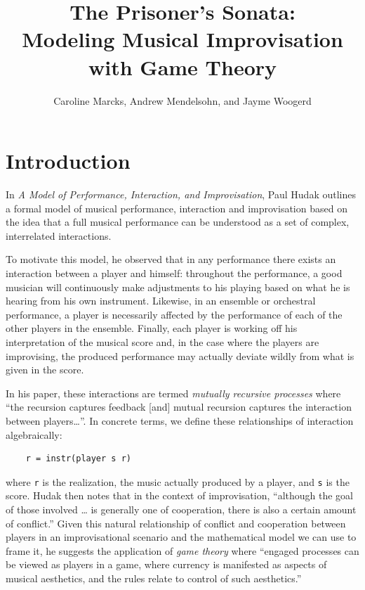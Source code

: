 \documentclass{article}
\begin{document}
\title{The Prisoner's Sonata: \\ \large Modeling Musical Improvisation with Game Theory}
\date{}
\author{Caroline Marcks, Andrew Mendelsohn, and Jayme Woogerd}
\maketitle


\section{Introduction}

In \emph{A Model of Performance, Interaction, and Improvisation}, Paul
Hudak outlines a formal model of musical performance, interaction and
improvisation based on the idea that a full musical performance can be
understood as a set of complex, interrelated interactions.

To motivate this model, he observed that in any performance there exists
an interaction between a player and himself: throughout the performance,
a good musician will continuously make adjustments to his playing based
on what he is hearing from his own instrument. Likewise, in an ensemble
or orchestral performance, a player is necessarily affected by the
performance of each of the other players in the ensemble. Finally, each
player is working off his interpretation of the musical score
and, in the case where the players are improvising, the produced
performance may actually deviate wildly from what is given in the score.

In his paper, these interactions are termed \emph{mutually recursive
processes} where ``the recursion captures feedback {[}and{]} mutual
recursion captures the interaction between players\ldots{}''. In
concrete terms, we define these relationships of interaction
algebraically:

\begin{verbatim}
    r = instr(player s r)
\end{verbatim}


where \texttt{r} is the realization, the music actually produced by a
player, and \texttt{s} is the score. Hudak then notes that in the
context of improvisation, ``although the goal of those involved \ldots{}
is generally one of cooperation, there is also a certain amount of
conflict.'' Given this natural relationship of conflict and cooperation
between players in an improvisational scenario and the mathematical
model we can use to frame it, he suggests the application of \emph{game
theory} where ``engaged processes can be viewed as players in a game,
where currency is manifested as aspects of musical aesthetics, and the
rules relate to control of such aesthetics.''
\end{document}
